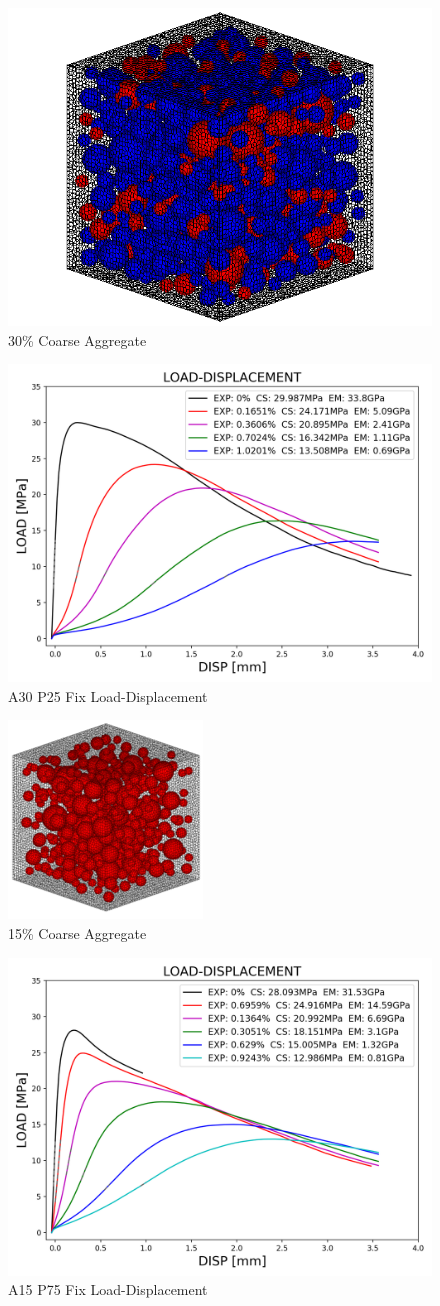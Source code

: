 \begin{figure}[ht]
\centering
\includegraphics[width=.3\linewidth]{Files/Aggregate/A30P25.png}
  \caption{30\% Coarse Aggregate}
  \label{fig:A30P25_model}
\end{figure}

\begin{figure}[ht]
\centering
\includegraphics[width=.8\linewidth]{Files/exp_3D/ASR/S13A30P25FIX-LOAD-DISPLACEMENT.png}
  \caption{A30 P25 Fix Load-Displacement}
  \label{fig:A30P25FIX_LD}
\end{figure}


\begin{figure}[ht]
\centering
\includegraphics[width=.3\linewidth]{Files/Aggregate/A15.png}
  \caption{15\% Coarse Aggregate}
  \label{fig:A15P75_model}
\end{figure}

\begin{figure}[ht]
\centering
\includegraphics[width=.8\linewidth]{Files/exp_3D/ASR/S13A15P75FIX-LOAD-DISPLACEMENT.png}
  \caption{A15 P75 Fix Load-Displacement}
  \label{fig:A15P75FIX_LD}
\end{figure}
